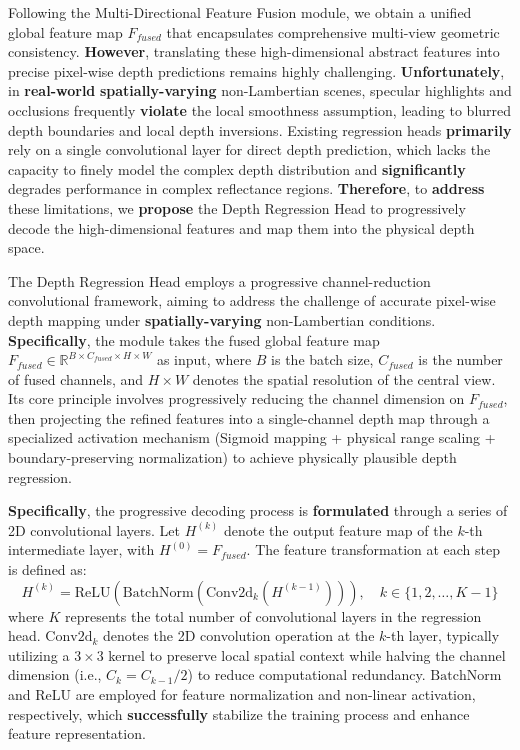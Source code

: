 \documentclass[journal]{IEEEtran}
\begin{document}
Following the Multi-Directional Feature Fusion module, we obtain a unified global feature map $F_{fused}$ that encapsulates comprehensive multi-view geometric consistency. \textbf{However}, translating these high-dimensional abstract features into precise pixel-wise depth predictions remains highly challenging. \textbf{Unfortunately}, in \textbf{real-world} \textbf{spatially-varying} non-Lambertian scenes, specular highlights and occlusions frequently \textbf{violate} the local smoothness assumption, leading to blurred depth boundaries and local depth inversions. Existing regression heads \textbf{primarily} rely on a single convolutional layer for direct depth prediction, which lacks the capacity to finely model the complex depth distribution and \textbf{significantly} degrades performance in complex reflectance regions. \textbf{Therefore}, to \textbf{address} these limitations, we \textbf{propose} the Depth Regression Head to progressively decode the high-dimensional features and map them into the physical depth space.

The Depth Regression Head employs a progressive channel-reduction convolutional framework, aiming to address the challenge of accurate pixel-wise depth mapping under \textbf{spatially-varying} non-Lambertian conditions. \textbf{Specifically}, the module takes the fused global feature map $F_{fused} \in \mathbb{R}^{B \times C_{fused} \times H \times W}$ as input, where $B$ is the batch size, $C_{fused}$ is the number of fused channels, and $H \times W$ denotes the spatial resolution of the central view. Its core principle involves progressively reducing the channel dimension on $F_{fused}$, then projecting the refined features into a single-channel depth map through a specialized activation mechanism (Sigmoid mapping + physical range scaling + boundary-preserving normalization) to achieve physically plausible depth regression.

\textbf{Specifically}, the progressive decoding process is \textbf{formulated} through a series of 2D convolutional layers. Let $H^{(k)}$ denote the output feature map of the $k$-th intermediate layer, with $H^{(0)} = F_{fused}$. The feature transformation at each step is defined as:
\[
\begin{equation}
H^{(k)} = \text{ReLU}(\text{BatchNorm}(\text{Conv2d}_{k}(H^{(k-1)}))), \quad k \in \{1, 2, \dots, K-1\}
\end{equation}
\]
where $K$ represents the total number of convolutional layers in the regression head. $\text{Conv2d}_{k}$ denotes the 2D convolution operation at the $k$-th layer, typically utilizing a $3 \times 3$ kernel to preserve local spatial context while halving the channel dimension (i.e., $C_{k} = C_{k-1}/2$) to reduce computational redundancy. $\text{BatchNorm}$ and $\text{ReLU}$ are employed for feature normalization and non-linear activation, respectively, which \textbf{successfully} stabilize the training process and enhance feature representation.
\end{document}
